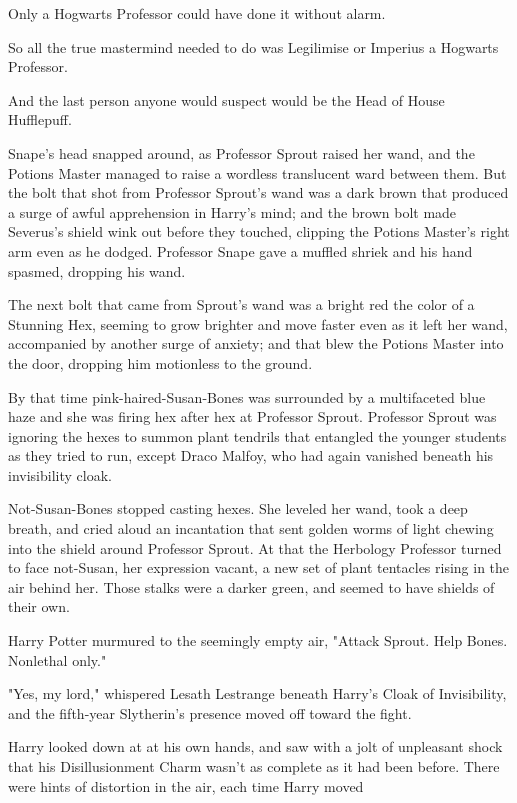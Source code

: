 Only a Hogwarts Professor could have done it without alarm.

So all the true mastermind needed to do was Legilimise or Imperius a Hogwarts
Professor.

And the last person anyone would suspect would be the Head of House Hufflepuff.

Snape's head snapped around, as Professor Sprout raised her wand, and the
Potions Master managed to raise a wordless translucent ward between them. But
the bolt that shot from Professor Sprout's wand was a dark brown that produced
a surge of awful apprehension in Harry's mind; and the brown bolt made
Severus's shield wink out before they touched, clipping the Potions Master's
right arm even as he dodged. Professor Snape gave a muffled shriek and his hand
spasmed, dropping his wand.

The next bolt that came from Sprout's wand was a bright red the color of a
Stunning Hex, seeming to grow brighter and move faster even as it left her
wand, accompanied by another surge of anxiety; and that blew the Potions Master
into the door, dropping him motionless to the ground.

By that time pink-haired-Susan-Bones was surrounded by a multifaceted blue haze
and she was firing hex after hex at Professor Sprout. Professor Sprout was
ignoring the hexes to summon plant tendrils that entangled the younger students
as they tried to run, except Draco Malfoy, who had again vanished beneath his
invisibility cloak.

Not-Susan-Bones stopped casting hexes. She leveled her wand, took a deep
breath, and cried aloud an incantation that sent golden worms of light chewing
into the shield around Professor Sprout. At that the Herbology Professor turned
to face not-Susan, her expression vacant, a new set of plant tentacles rising
in the air behind her. Those stalks were a darker green, and seemed to have
shields of their own.

Harry Potter murmured to the seemingly empty air, "Attack Sprout. Help Bones.
Nonlethal only."

"Yes, my lord," whispered Lesath Lestrange beneath Harry's Cloak of
Invisibility, and the fifth-year Slytherin's presence moved off toward the
fight.

Harry looked down at at his own hands, and saw with a jolt of unpleasant shock
that his Disillusionment Charm wasn't as complete as it had been before. There
were hints of distortion in the air, each time Harry moved{\el}

